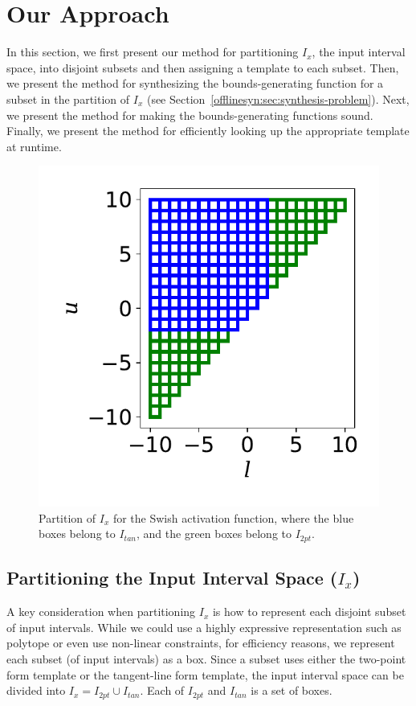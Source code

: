 \section{Our Approach}
\label{offlinesyn:sec:method-1}

In this section, we first present our method for partitioning $ I_x $,
the input interval space, into disjoint subsets and then assigning a
template to each subset. Then, we present the method for synthesizing
the bounds-generating function for a subset in the partition of
$I_x$ (see Section~\ref{offlinesyn:sec:synthesis-problem}).
Next, we present the method for making the bounds-generating
functions sound. Finally, we present the method for efficiently
looking up the appropriate template at runtime.

\begin{figure}[t]
	\centering
	\includegraphics[width=0.4\linewidth]{offlinesyn/figs/partition.pdf}
	\caption{Partition of $ I_x $ for the Swish activation function, where the blue boxes belong
	to $ I_{tan} $, and the green boxes belong to $ I_{2pt} $.
	\label{offlinesyn:fig:partition}}
\end{figure}

\subsection{Partitioning the Input Interval Space ($I_x$)}

A key consideration when partitioning $ I_x $ is how to represent each disjoint
subset of input intervals. While we could use a highly expressive representation such as polytope
or even use non-linear constraints, for efficiency reasons, we represent each
subset (of input intervals) as a box. Since a subset uses either the two-point
form template or the tangent-line form template, the input interval space can
be divided into
$I_x = I_{2pt}\cup I_{tan}$.
%
Each of $I_{2pt} $ and $ I_{tan} $ is  a set of boxes.


